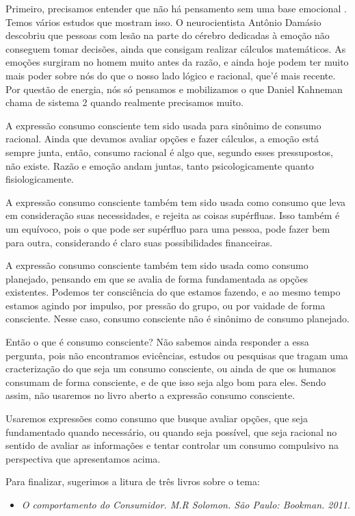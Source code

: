 \begin{paginatexto}
Primeiro, precisamos entender que não há pensamento sem uma base emocional \citep{ferreira2008}. Temos vários estudos que mostram isso. O neurocientista Antônio Damásio descobriu que pessoas com lesão na parte do cérebro dedicadas à emoção não conseguem tomar decisões, ainda que consigam realizar cálculos matemáticos. As emoções surgiram no homem muito antes da razão, e ainda hoje podem ter muito mais poder sobre nós do que o nosso lado lógico e racional, que'é mais recente. Por questão de energia, nós só pensamos e mobilizamos o que Daniel Kahneman chama de sistema 2 quando realmente precisamos muito.

A expressão consumo consciente tem sido usada para sinônimo de consumo racional. Ainda que devamos avaliar opções e fazer cálculos, a emoção está sempre junta, então, consumo racional é algo que, segundo esses pressupostos, não existe. Razão e emoção andam juntas, tanto psicologicamente quanto fisiologicamente.

A expressão consumo consciente também tem sido usada como consumo que leva em consideração suas necessidades, e rejeita as coisas supérfluas. Isso também é um equívoco, pois o que pode ser supérfluo para uma pessoa, pode fazer bem para outra, considerando é claro suas possibilidades financeiras.

A expressão consumo consciente também tem sido usada como consumo planejado, pensando em que se avalia de forma fundamentada as opções existentes. Podemos ter consciência do que estamos fazendo, e ao mesmo tempo estamos agindo por impulso, por pressão do grupo, ou por vaidade de forma consciente. Nesse caso, consumo consciente não é sinônimo de consumo planejado.

Então o que é consumo consciente? Não sabemos ainda responder a essa pergunta, pois não encontramos evicências, estudos ou pesquisas que tragam uma cracterização do que seja um consumo consciente, ou ainda de que os humanos consumam de forma consciente, e de que isso seja algo bom para eles. Sendo assim, não usaremos no livro aberto a expressão consumo consciente.

Usaremos expressões como consumo que busque avaliar opções, que seja fundamentado quando necessário, ou quando seja possível, que seja racional no sentido de avaliar as informações e tentar controlar um consumo compulsivo na perspectiva que apresentamos acima.


   Para finalizar, sugerimos a litura de três livros sobre o tema:
  \begin{itemize}
    \item \textit{O comportamento do Consumidor. M.R Solomon. São Paulo: Bookman. 2011}.


\end{itemize}
\end{paginatexto}
